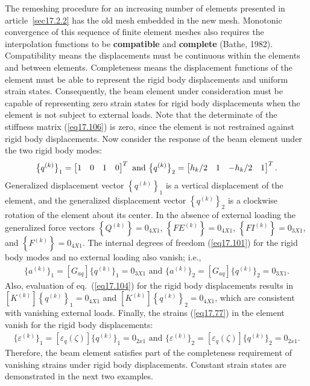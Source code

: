 \documentclass{AeroStructure-ERJohnson}
\begin{document}
The remeshing procedure for an increasing number of elements presented in article~\ref{sec17.2.2} has the old mesh embedded in the new mesh. Monotonic convergence of this sequence of finite element meshes also requires the interpolation functions to be \textbf{compatible} and \textbf{complete} (Bathe, 1982). Compatibility means the displacements must be continuous within the elements and between elements. Completeness means the displacement functions of the element must be able to represent the rigid body displacements and uniform strain states. Consequently, the beam element under consideration must be capable of representing zero strain states for rigid body displacements when the element is not subject to external loads. Note that the determinate of the stiffness matrix (\ref{eq17.106}) is zero, since the element is not restrained against rigid body displacements. Now consider the response of the beam element under the two rigid body modes:
\begin{align}\label{eq17.113}
\big\{q^{(k)}\big\}_{1}=\left[\begin{array}{@{}llll@{}}1 & 0 & 1 & 0\end{array}\right]^{T} \textrm{ and } \big\{q^{(k)}\big\}_{2}=\left[\begin{array}{@{}llll@{}}h_{k}/2 & 1 & -h_{k}/2 & 1\end{array}\right]^{T}.
\end{align}
Generalized displacement vector $\left\{q^{(k)}\right\}_{1}$ is a vertical displacement of the element, and the generalized displacement vector $\left\{q^{(k)}\right\}_{2}$ is a clockwise rotation of the element about its center. In the absence of external loading the generalized force vectors $\left\{Q^{(k)}\right\}=0_{4 X 1}$, $\left\{F E^{(k)}\right\}=0_{4 X 1}$, $\left\{F I^{(k)}\right\}=0_{3 X 1}$, and $\left\{F^{(k)}\right\}=0_{4 X 1}$. The internal degrees of freedom (\ref{eq17.101}) for the rigid body modes and no external loading also vanish; i.e.,
\begin{align}\label{eq17.114}
\big\{a^{(k)}\big\}_{1}=\left[G_{a q}\right]\big\{q^{(k)}\big\}_{1}=0_{3 X 1} \textrm{ and } \big\{a^{(k)}\big\}_{2}=\left[G_{a q}\right]\big\{q^{(k)}\big\}_{2}=0_{3 X 1}.
\end{align}
Also, evaluation of eq.~(\ref{eq17.104}) for the rigid body displacements results in $\left[K^{(k)}\right]\left\{q^{(k)}\right\}_{1}=0_{4 X 1}$ and $\left[K^{(k)}\right]\left\{q^{(k)}\right\}_{2}=0_{4 X 1}$, which are consistent with vanishing external loads. Finally, the strains (\ref{eq17.77}) in the element vanish for the rigid body displacements:
\begin{align}\label{eq17.115}
\big\{\varepsilon^{(k)}\big\}_{1}=\left[\varepsilon_{q}(\zeta)\right]\big\{q^{(k)}\big\}_{1}=0_{2 x 1} \textrm{ and } \big\{\varepsilon^{(k)}\big\}_{2}=\left[\varepsilon_{q}(\zeta)\right]\big\{q^{(k)}\big\}_{2}=0_{2 x 1}.
\end{align}
Therefore, the beam element satisfies part of the completeness requirement of vanishing strains under rigid body displacements. Constant strain states are demonstrated in the next two examples.
\end{document}
